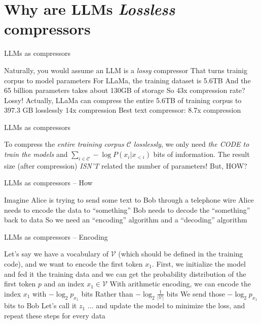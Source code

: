 \documentclass[scheme=plain]{ctexbeamer}
\begin{document}
\section[LLMs as compressors]{Why are LLMs \emph{Lossless} compressors}

\begin{frame}{LLMs as compressors}
  \begin{outline}
    \1 Naturally, you would assume an LLM is a \emph{lossy} compressor
      \2 That turns trainig corpus to model parameters
      \2 For LLaMa, the training dataset is 5.6TB
      \2 And the 65 billion parameters takes about 130GB of storage
        \3 So 43x compression rate?
        \3 Lossy!
    \pause
    \1 Actually, LLaMa can compress the entire 5.6TB of training corpus to 397.3 GB losslessly
      \2 14x compression
      \2 Best text compressor: 8.7x compression
  \end{outline}
\end{frame}



\begin{frame}{LLMs as compressors}
  \begin{outline}
    \1 To compress the \emph{entire training corpus $\mathcal{C}$ losslessly}, we only need \emph{the CODE to train the models} and $\sum_{i \in \mathcal{C}} - \log P(x_i | x_{<i}) $ bits of imformation.
      \2 The result size (after compression) \emph{ISN'T} related the number of parameters!
      \pause
    \1 But, HOW?
  \end{outline}
\end{frame}

\begin{frame}{LLMs as compressors -- How}
  \begin{outline}
    \1 Imagine Alice is trying to send some text to Bob through a telephone wire
    \1 Alice needs to encode the data to ``something''
    \1 Bob needs to decode the ``something'' back to data
    \1 So we need an ``encoding'' algorithm and a ``decoding'' algorithm
  \end{outline}
\end{frame}

\begin{frame}{LLMs as compressors -- Encoding}
  \begin{outline}
    \1 Let's say we have a vocabulary of \(\mathcal{V}\) (which should be defined in the training code), and we want to encode the first token \(x_1\).
    \pause
    \1 First, we initialize the model and fed it the training data
      \2 and we can get the probability distribution of the first token $p$ and an index $x_1 \in \mathcal{V}$
      \pause
    \1 With arithmetic encoding, we can encode the index $x_1$ with $-\log_2 p_{x_1}$ bits
      \2 Rather than $-\log_2 \frac{1}{|\mathcal{V}|}$ bits
      \pause
    \1 We send those $-\log_2 p_{x_1}$ bits to Bob
      \2 Let's call it $z_1$
      \pause
    \1 $\dots$ and update the model to minimize the loss, and repeat these steps for every data
    \pause
  \end{outline}
\end{frame}
\end{document}

